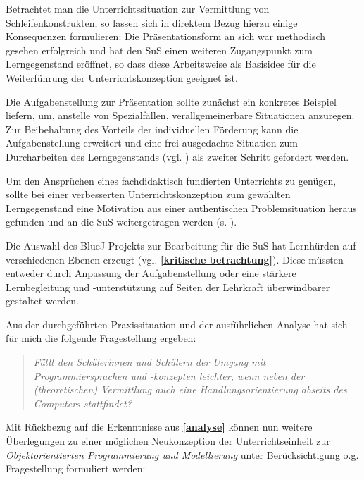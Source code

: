 \documentclass[paper=a4, DIV=13, BCOR=12mm, twoside=on, onecolumn=on, open = any, titlepage =on, parskip =half-, headsepline = on, footsepline = on, chapterprefix = on, sectionprefix = on, appendixprefix = off, fontsize = 12pt, numbers = noenddot, abstract = off]{scrreprt}
\begin{document}
Betrachtet man die Unterrichtssituation zur Vermittlung von Schleifenkonstrukten, so lassen sich in direktem Bezug hierzu einige Konsequenzen formulieren:
Die Präsentationsform an sich war methodisch gesehen erfolgreich und hat den SuS einen weiteren Zugangspunkt zum Lerngegenstand eröffnet, so dass diese Arbeitsweise als Basisidee für die Weiterführung der Unterrichtskonzeption geeignet ist.

Die Aufgabenstellung zur Präsentation sollte zunächst ein konkretes Beispiel liefern, um, anstelle von Spezialfällen, verallgemeinerbare Situationen anzuregen. Zur Beibehaltung des Vorteils der individuellen Förderung kann die Aufgabenstellung erweitert und eine frei ausgedachte Situation zum Durcharbeiten des Lerngegenstands (vgl. \cite{aebli:11}) als zweiter Schritt gefordert werden.

Um den Ansprüchen eines fachdidaktisch fundierten Unterrichts zu genügen, sollte bei einer verbesserten Unterrichtskonzeption zum gewählten Lerngegenstand eine Motivation aus einer authentischen Problemsituation heraus gefunden und an die SuS weitergetragen werden (s. \cite[S.68]{hubwieser:07}).

Die Auswahl des BlueJ-Projekts zur Bearbeitung für die SuS hat Lernhürden auf verschiedenen Ebenen erzeugt (vgl. \textbf{\ref{kritische betrachtung}}). Diese müssten entweder durch Anpassung der Aufgabenstellung oder eine stärkere Lernbegleitung und -unterstützung auf Seiten der Lehrkraft überwindbarer gestaltet werden. 


Aus der durchgeführten Praxissituation und der ausführlichen Analyse hat sich für mich die folgende Fragestellung ergeben:
\begin{quote}
\emph{Fällt den Schülerinnen und Schülern der Umgang mit Programmiersprachen und -konzepten leichter, wenn neben der (theoretischen) Vermittlung auch eine Handlungsorientierung abseits des Computers stattfindet?}
\end{quote}

Mit Rückbezug auf die Erkenntnisse aus \textbf{\ref{analyse}} können nun weitere Überlegungen zu einer möglichen  Neukonzeption der Unterrichtseinheit zur \emph{Objektorientierten Programmierung und Modellierung} unter Berücksichtigung o.g. Fragestellung formuliert werden:
\end{document}
